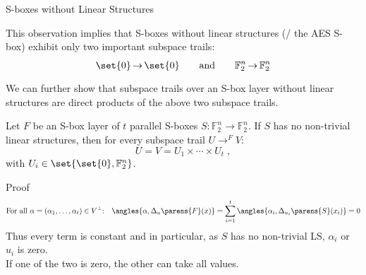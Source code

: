 \documentclass[%
    10pt,
    professionalfont,
    aspectratio=169,
    handout,
]{beamer}
\newcommand{\F}{\mathbb{F}}
\newcommand{\derive}[2]{\Delta_{#1}\parens{#2}}
\renewcommand{\iprod}[2]{\angles{#1, #2}}
\DeclareMathOperator*{\diffOp}{\rightarrow}
\newcommand{\propDiff}[4]{#1 \diffOp^{#2}_{#3} #4}
\begin{document}
\begin{frame}{S-boxes without Linear Structures}
    \begin{minipage}{0.48\textwidth}
    This observation implies that S-boxes without linear structures (\eg/ the AES S-box) exhibit only two important subspace trails:
    \begin{equation*}
        \propDiff{\set{0}}{}{}{\set{0}} \qquad \text{and} \qquad \propDiff{\F_2^n}{}{}{\F_2^n}
    \end{equation*}
    We can further show that subspace trails over an S-box layer without linear structures are direct products of the above two subspace trails.
    \end{minipage}\hspace{15pt}%
    \pause%
    \begin{minipage}{0.45\textwidth}
    \begin{theorem}
        Let $F$ be an S-box layer of $t$ parallel S-boxes $S : \F_2^n \to \F_2^n$.
        If $S$ has no non-trivial linear structures, then for every subspace trail $\propDiff{U}{F}{}{V}$:
        \begin{equation*}
            U = V = U_1 \times \cdots \times U_t\;,
        \end{equation*}
        with $U_i \in \set{\set{0}, \F_2^n}$.
    \end{theorem}
    \end{minipage}
    \pause

    \begin{block}{Proof}
        \vspace*{-25pt}
        \begin{equation*}
            \text{For all $\alpha = (\alpha_1, \ldots, \alpha_t) \in V^\perp$:} \quad
            \iprod{\alpha}{\derive{u}{F}(x)}
            = \sum_{i=1}^t \iprod{\alpha_i}{\derive{u_i}{S}(x_i)}
            = 0
        \end{equation*}
        Thus every term is constant and in particular, as $S$ has no non-trivial LS, $\alpha_i$ or $u_i$ is zero.\\
        If one of the two is zero, the other can take all values.\hfill\qedsymbol
    \end{block}
\end{frame}
\end{document}
